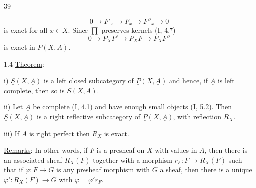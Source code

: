 \begin{flushright}39\end{flushright}
\[
0\longrightarrow F'_x\longrightarrow F_x\longrightarrow F''_x\longrightarrow0
\]
is exact for all $x\in X$. Since $\prod$ preserves kernels (I, 4.7)
\[
0\longrightarrow P_XF'\longrightarrow P_XF\longrightarrow P_XF''
\]
is exact in $\underline P(X,\underline A)$.

1.4 \uline{Theorem}:

i) $\underline S(X,\underline A)$ is a left closed subcategory of $\underline P(X,\underline A)$ and hence, if $\underline A$ is left complete, then so is $\underline S(X,\underline A)$.

ii) Let $\underline A$ be complete (I, 4.1) and have enough small objects (I, 5.2). Then $\underline S(X,\underline A)$ is a right reflective subcategory of $\underline P(X,\underline A)$, with reflection $R_X$.

iii) If $\underline A$ is right perfect then $R_X$ is exact.

\uline{Remarks}: In other words, if $F$ is a presheaf on $X$ with values in $\underline A$, then there is an associated sheaf $R_X(F)$ together with a morphism $r_F:F\longrightarrow R_X(F)$ such that if $\varphi:F\longrightarrow G$ is any presheaf morphism with $G$ a sheaf, then there is a unique $\varphi':R_X(F)\longrightarrow G$ with $\varphi=\varphi'r_F$.
